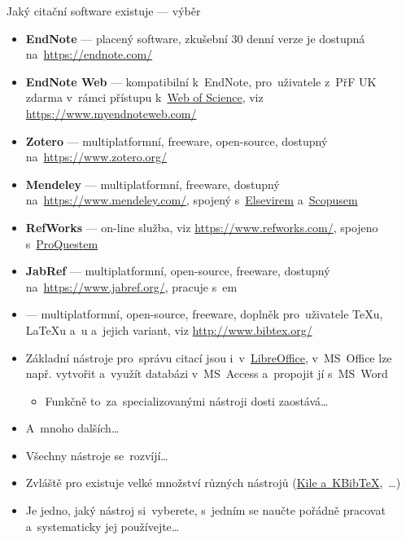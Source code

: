 \documentclass[compress, ucs, xelatex, 11pt, xcolor=svgnames, aspectratio=169,
	hyperref={
		bookmarks=true,
		unicode=true,
		colorlinks=true,
		pdftitle={Citacni software},
		plainpages=false,
		pdfauthor={Vojtech Zeisek},
		pdfsubject={Kratky uvod do citacniho software},
		pdfcreator={XeLaTeX},
		pdfkeywords={citace, reference, software, literatura},
		linkcolor=Crimson, %
		anchorcolor=Magenta, %
		citecolor=Magenta, %
		filecolor=Magenta, %
		menucolor=Magenta, %
		urlcolor=DarkTurquoise, %
		pdftex},
	url={hyphens, lowtilde} %
	]{beamer}
\begin{document}
\begin{frame}[allowframebreaks]{Jaký citační software existuje --- výběr}
	\begin{itemize}
		\item \textbf{EndNote} --- placený software, zkušební 30 denní verze je dostupná na~\url{https://endnote.com/}
		\item \textbf{EndNote Web} --- kompatibilní k~EndNote, pro~uživatele z~PřF UK zdarma v~rámci přístupu k~\href{https://www.webofscience.com/}{Web of Science}, viz \url{https://www.myendnoteweb.com/}
		\item \textbf{Zotero} --- multiplatformní, freeware, open-source, dostupný na~\url{https://www.zotero.org/}
		\item \textbf{Mendeley} --- multiplatformní, freeware, dostupný na~\url{https://www.mendeley.com/}, spojený s~\href{https://www.elsevier.com/}{Elsevirem}  a~\href{https://www.scopus.com/}{Scopusem}
		\item \textbf{RefWorks} --- on-line služba, viz \url{https://www.refworks.com/}, spojeno s~\href{https://www.proquest.com/}{ProQuestem}
		\item \textbf{JabRef} --- multiplatformní, open-source, freeware, dostupný na~\url{https://www.jabref.org/}, pracuje s~\BibTeX em
		\item \textbf{\BibTeX} --- multiplatformní, open-source, freeware, doplněk pro~uživatele \TeX u, \LaTeX u a~\XeLaTeX u a~jejich variant, viz \url{http://www.bibtex.org/}
		\item Základní nástroje pro~správu citací jsou i~v~\href{https://www.openoffice.cz/navody/jak-vytvorit-a-upravovat-seznam-pouzite-literatury}{LibreOffice}, v~MS~Office lze např. vytvořit a~využít databázi v~MS~Access a~propojit jí s~MS~Word
		\begin{itemize}
			\item Funkčně to~za~specializovanými nástroji dosti zaostává\ldots
		\end{itemize}
		\item A~mnoho dalších\ldots
		\item Všechny nástroje se~rozvíjí\ldots
		\item Zvláště pro \BibTeX existuje velké množství různých nástrojů (\href{https://www.linuxexpres.cz/software/kile-a-kbibtex}{Kile a~KBibTeX},~\ldots)
		\item Je jedno, jaký nástroj si~vyberete, s~jedním se naučte pořádně pracovat a~systematicky jej používejte\ldots
	\end{itemize}
\end{frame}
\end{document}
